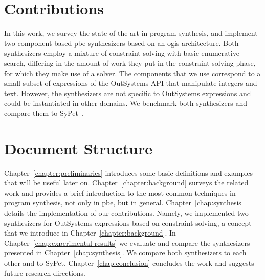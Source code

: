 \section{Contributions}

In this work, we survey the state of the art in program synthesis, and
implement two component-based \gls{pbe} synthesizers based on an \gls{ogis}
architecture.
Both synthesizers employ a mixture of constraint solving with basic enumerative
search, differing in the amount of work they put in the constraint solving
phase, for which they make use of a  solver.
The components that we use correspond to a small subset of expressions of the
OutSystems API that manipulate integers and text.
However, the synthesizers are not specific to OutSystems expressions and could
be instantiated in other domains.
We benchmark both synthesizers and compare them to SyPet~\cite{Feng:2017:CSC}.

\section{Document Structure}
\label{sec:structure}

Chapter~\ref{chapter:preliminaries} introduces some basic definitions and examples
that will be useful later on.
Chapter~\ref{chapter:background} surveys the related work and provides a brief
introduction to the most common techniques in program synthesis, not only in
\gls{pbe}, but in general.
Chapter~\ref{chap:synthesis} details the implementation of our contributions.
Namely, we implemented two synthesizers for OutSystems expressions based on
constraint solving, a concept that we introduce in
Chapter~\ref{chapter:background}.
In Chapter~\ref{chap:experimental-results} we evaluate and compare the
synthesizers presented in Chapter~\ref{chap:synthesis}.
We compare both synthesizers to each other and to SyPet.
Chapter~\ref{chap:conclusion} concludes the work and suggests future research
directions.